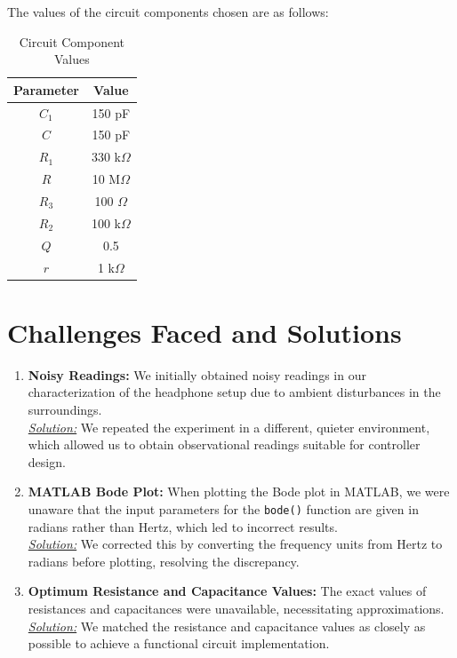 \documentclass{article}
\begin{document}
The values of the circuit components chosen are as follows:

\begin{table}[!htb]
  \centering
  \begin{tabular}{|c|c|}
    \hline
    Parameter & Value \\ \hline
    \( C_1 \) & 150 pF \\ 
    \( C \) & 150 pF \\ 
    \( R_1 \) & 330 k\(\Omega\) \\ 
    \( R \) & 10 M\(\Omega\) \\ 
    \( R_3 \) & 100 \(\Omega\) \\ 
    \( R_2 \) & 100 k\(\Omega\) \\ 
    \( Q \) & 0.5 \\ 
    \( r \) & 1 k\(\Omega\) \\ \hline
  \end{tabular}
  \caption{Circuit Component Values}
\end{table}

\newpage
\section{Challenges Faced and Solutions}
\begin{enumerate}[left=0pt, label=\textbf{Problem \arabic*}:, itemsep=10pt]
  \item \textbf{Noisy Readings:} We initially obtained noisy readings in our characterization of the headphone setup due to ambient disturbances in the surroundings. \\
  \underline{\textit{Solution:}} We repeated the experiment in a different, quieter environment, which allowed us to obtain observational readings suitable for controller design.

  \item \textbf{MATLAB Bode Plot:} When plotting the Bode plot in MATLAB, we were unaware that the input parameters for the \texttt{bode()} function are given in radians rather than Hertz, which led to incorrect results. \\
  \underline{\textit{Solution:}} We corrected this by converting the frequency units from Hertz to radians before plotting, resolving the discrepancy.

  \item \textbf{Optimum Resistance and Capacitance Values:} The exact values of resistances and capacitances were unavailable, necessitating approximations. \\
  \underline{\textit{Solution:}} We matched the resistance and capacitance values as closely as possible to achieve a functional circuit implementation.
\end{enumerate}
\end{document}
